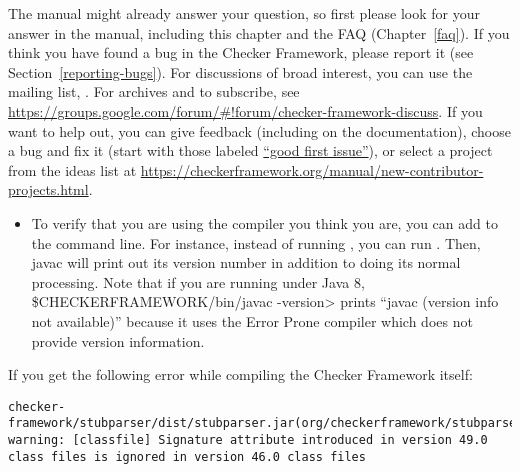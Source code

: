 \htmlhr
{}

\begin{sloppypar}
The manual might already answer your question, so first please look for
your answer in the manual,
including this chapter and the FAQ (Chapter~\ref{faq}).
If you think you have found a bug in the Checker Framework,
please report it (see Section~\ref{reporting-bugs}).
For discussions of broad interest, you can use the mailing list,
.
For archives and to subscribe, see \url{https://groups.google.com/forum/#!forum/checker-framework-discuss}.
If you want to help out, you can give feedback (including on the
documentation), choose a bug and fix it (start with those labeled
\href{https://github.com/typetools/checker-framework/issues?q=is\%3Aissue+is\%3Aopen+label\%3A\%22good+first+issue%22}{``good
first
issue''}),
or select a
project from the ideas list at
\url{https://checkerframework.org/manual/new-contributor-projects.html}.
\end{sloppypar}



\begin{itemize}
\item
To verify that you are using the compiler you think you are, you can add
 to the command line.  For instance, instead of running
, you can run .  Then, javac will print out its version number in addition
to doing its normal processing.  Note that if you are running under Java 8,
\<\$CHECKERFRAMEWORK/bin/javac -version> prints ``javac (version info
not available)'' because it uses the Error Prone compiler which does not
provide version information.

\end{itemize}



If you get the following error while compiling the Checker Framework itself:

\begin{smaller}
\begin{Verbatim}
checker-framework/stubparser/dist/stubparser.jar(org/checkerframework/stubparser/ast/CompilationUnit.class):
warning: [classfile] Signature attribute introduced in version 49.0 class files is ignored in version 46.0 class files
\end{Verbatim}
\end{smaller}

